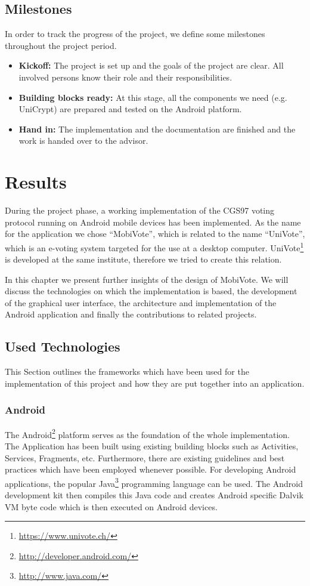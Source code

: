 \documentclass[numbers=noenddot, abstract=on, a4paper, headsepline,
footsepline, oneside, draft=off]{scrreprt}
\begin{document}
\section{Milestones}
\label{sec:milestones}
In order to track the progress of the project, we define some milestones
throughout the project period.
\begin{itemize}
  \item \textbf{Kickoff:} The project is set up and the goals of the project
  are clear. All involved persons know their role and their responsibilities.
  \item \textbf{Building blocks ready:} At this stage, all the components we
  need (e.g. UniCrypt) are prepared and tested on the Android platform.
  \item \textbf{Hand in:} The implementation and the documentation are finished
  and the work is handed over to the advisor.
\end{itemize}

\chapter{Results}
\label{cha:results}
During the project phase, a working implementation of the CGS97 voting protocol
running on Android mobile devices has been implemented. As the name for the
application we chose ``MobiVote'', which is related to the name ``UniVote'',
which is an e-voting system targeted for the use at a desktop computer.
UniVote\footnote{\url{https://www.univote.ch/}} is developed at the same
institute, therefore we tried to create this relation.

In this chapter we present further insights of the design of MobiVote. We will
discuss the technologies on which the implementation is based, the development
of the graphical user interface, the architecture and implementation of the
Android application and finally the contributions to related projects.

\section{Used Technologies}
This Section outlines the frameworks which have been used for the implementation
of this project and how they are put together into an application.
\subsection{Android}
The Android\footnote{\url{http://developer.android.com/}} platform serves as the
foundation of the whole implementation. The Application has been built using
existing building blocks such as Activities, Services, Fragments, etc.
Furthermore, there are existing guidelines and best practices which have been
employed whenever possible. For developing Android applications, the popular
Java\footnote{\url{http://www.java.com/}} programming language can be used. The
Android development kit then compiles this Java code and creates Android
specific Dalvik VM byte code which is then executed on Android devices.
\end{document}
